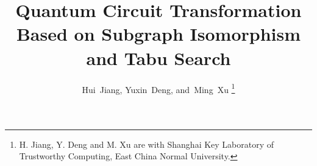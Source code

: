 \documentclass[journal]{IEEEtran}
\begin{document}
	\title{Quantum Circuit Transformation Based on Subgraph Isomorphism and Tabu Search}
	
	\author{Hui~Jiang, %
		Yuxin~Deng, %
		and~Ming~Xu%
		\thanks{H. Jiang, Y. Deng and M. Xu are with Shanghai Key Laboratory of Trustworthy Computing, 
			East China Normal University.}%
	}
	
	
	
	
	
	
	
	
	
	
	
	
	
	\maketitle
	
\end{document}
